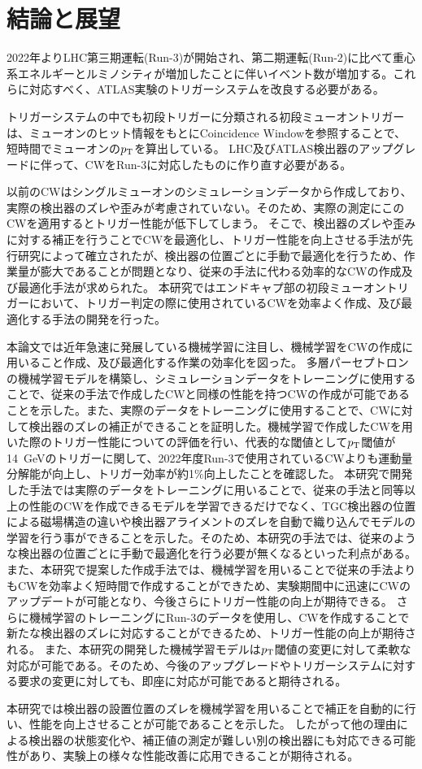 \chapter{結論と展望}\label{chapter6}
2022年よりLHC第三期運転(Run-3)が開始され、第二期運転(Run-2)に比べて重心系エネルギーとルミノシティが増加したことに伴いイベント数が増加する。これらに対応すべく、ATLAS実験のトリガーシステムを改良する必要がある。

トリガーシステムの中でも初段トリガーに分類される初段ミューオントリガーは、ミューオンのヒット情報をもとにCoincidence Windowを参照することで、短時間でミューオンの$p_{\rm{T}}$を算出している。
LHC及びATLAS検出器のアップグレードに伴って、CWをRun-3に対応したものに作り直す必要がある。

以前のCWはシングルミューオンのシミュレーションデータから作成しており、実際の検出器のズレや歪みが考慮されていない。そのため、実際の測定にこのCWを適用するとトリガー性能が低下してしまう。
そこで、検出器のズレや歪みに対する補正を行うことでCWを最適化し、トリガー性能を向上させる手法が先行研究によって確立されたが、検出器の位置ごとに手動で最適化を行うため、作業量が膨大であることが問題となり、従来の手法に代わる効率的なCWの作成及び最適化手法が求められた。
本研究ではエンドキャプ部の初段ミューオントリガーにおいて、トリガー判定の際に使用されているCWを効率よく作成、及び最適化する手法の開発を行った。

本論文では近年急速に発展している機械学習に注目し、機械学習をCWの作成に用いること作成、及び最適化する作業の効率化を図った。
多層パーセプトロンの機械学習モデルを構築し、シミュレーションデータをトレーニングに使用することで、従来の手法で作成したCWと同様の性能を持つCWの作成が可能であることを示した。また、実際のデータをトレーニングに使用することで、CWに対して検出器のズレの補正ができることを証明した。機械学習で作成したCWを用いた際のトリガー性能についての評価を行い、代表的な閾値として$p_{\rm{T}}$閾値が14~GeVのトリガーに関して、2022年度Run-3で使用されているCWよりも運動量分解能が向上し、トリガー効率が約1$\%$向上したことを確認した。
本研究で開発した手法では実際のデータをトレーニングに用いることで、従来の手法と同等以上の性能のCWを作成できるモデルを学習できるだけでなく、TGC検出器の位置による磁場構造の違いや検出器アライメントのズレを自動で織り込んでモデルの学習を行う事ができることを示した。そのため、本研究の手法では、従来のような検出器の位置ごとに手動で最適化を行う必要が無くなるといった利点がある。
また、本研究で提案した作成手法では、機械学習を用いることで従来の手法よりもCWを効率よく短時間で作成することができため、実験期間中に迅速にCWのアップデートが可能となり、今後さらにトリガー性能の向上が期待できる。
さらに機械学習のトレーニングにRun-3のデータを使用し、CWを作成することで新たな検出器のズレに対応することができるため、トリガー性能の向上が期待される。
また、本研究の開発した機械学習モデルは$p_{\rm{T}}$閾値の変更に対して柔軟な対応が可能である。そのため、今後のアップグレードやトリガーシステムに対する要求の変更に対しても、即座に対応が可能であると期待される。

本研究では検出器の設置位置のズレを機械学習を用いることで補正を自動的に行い、性能を向上させることが可能であることを示した。
したがって他の理由による検出器の状態変化や、補正値の測定が難しい別の検出器にも対応できる可能性があり、実験上の様々な性能改善に応用できることが期待される。


